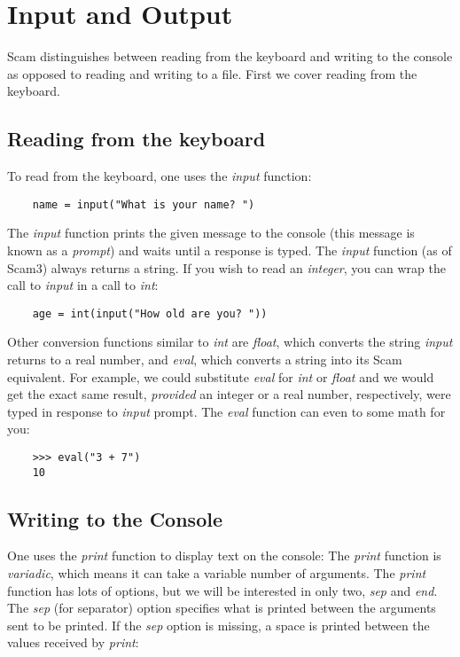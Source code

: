 \chapter{Input and Output}
\label{InputAndOutput}

Scam distinguishes between reading from the keyboard
and writing to the console as opposed to reading and writing
to a file. First we cover reading from the keyboard.

\section{Reading from the keyboard}

To read from the keyboard, one uses the
{\it input} function:

\begin{verbatim}
    name = input("What is your name? ")
\end{verbatim}

The {\it input} function prints the given message to  the console
(this message is known as a {\it prompt})
and waits until a response is typed.
The {\it input} function (as of Scam3) always returns a string.
If you wish to read an {\it integer}, you can wrap the call to {\it input}
in a call to {\it int}:

\begin{verbatim}
    age = int(input("How old are you? "))
\end{verbatim}

Other conversion functions similar to {\it int} are {\it float}, which
converts the string {\it input} returns to a real number, and
{\it eval}, which converts a string into its Scam equivalent.
For example, we could substitute {\it eval} for {\it int} or {\it float} and
we would get the exact same result, {\it provided} an integer
or a real number, respectively, were typed in response to
{\it input} prompt. The {\it eval} function can even to some math for you:

\begin{verbatim}
    >>> eval("3 + 7")
    10
\end{verbatim}

\section{Writing to the Console}

One uses the {\it print} function to display text on the console:
The {\it print} function is {\it variadic}, which means
it can take a variable number
of arguments.
The {\it print} function has lots of options, but we will be
interested in only two, {\it sep} and {\it end}.
The {\it sep} (for separator) option specifies what
is printed between the arguments
sent to be printed. If the {\it sep} option is missing, a
space is printed between the values received by {\it print}:

